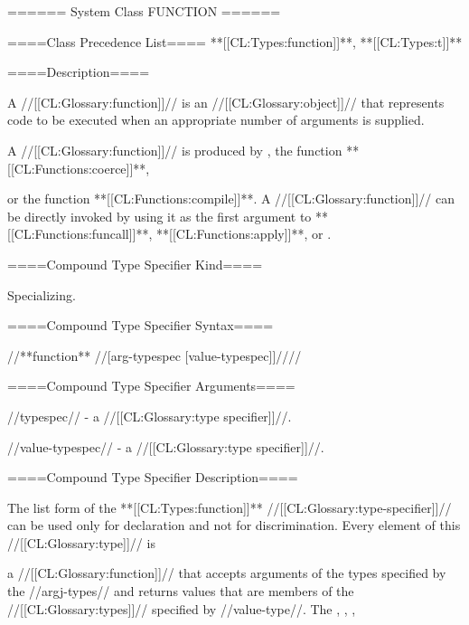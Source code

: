 ====== System Class FUNCTION ======

====Class Precedence List==== **[[CL:Types:function]]**, **[[CL:Types:t]]**

====Description====

A //[[CL:Glossary:function]]// is an //[[CL:Glossary:object]]// that represents code to be executed when an appropriate number of arguments is supplied.

A //[[CL:Glossary:function]]// is produced by , the function **[[CL:Functions:coerce]]**,

or the function **[[CL:Functions:compile]]**. A //[[CL:Glossary:function]]// can be directly invoked by using it as the first argument to **[[CL:Functions:funcall]]**, **[[CL:Functions:apply]]**, or .

====Compound Type Specifier Kind====

Specializing.

====Compound Type Specifier Syntax====

//**function** //[arg-typespec [value-typespec]]////


====Compound Type Specifier Arguments====

//typespec// - a //[[CL:Glossary:type specifier]]//.

//value-typespec// - a //[[CL:Glossary:type specifier]]//.

====Compound Type Specifier Description====




The list form of the **[[CL:Types:function]]** //[[CL:Glossary:type-specifier]]// can be used only for declaration and not for discrimination. Every element of this //[[CL:Glossary:type]]// is

a //[[CL:Glossary:function]]// that accepts arguments of the types specified by the //argj-types// and returns values that are members of the //[[CL:Glossary:types]]// specified by //value-type//. The , , ,

